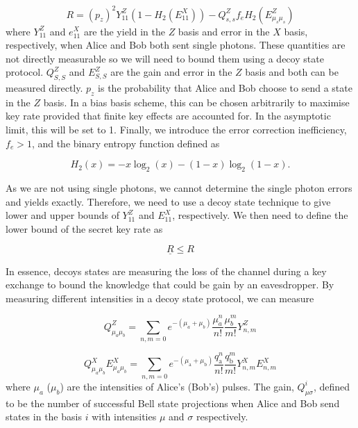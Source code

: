 \begin{equation}
	R = (p_z)^2 Y_{11}^Z \left(1 - H_2(E_{11}^X)\right) - Q_{s,s}^Z f_e H_2(E_{\mu_s\mu_s}^Z)
\end{equation}
where $Y_{11}^Z$ and $e_{11}^X$ are the yield in the $Z$ basis and error in the $X$ basis, respectively, when Alice and Bob both sent single photons. These quantities are not directly measurable so we will need to bound them using a decoy state protocol. $Q_{S,S}^Z$ and $E_{S,S}^Z$ are the gain and error in the $Z$ basis and both can be measured directly. $p_z$  is the probability that Alice and Bob choose to send a state in the $Z$ basis. In a bias basis scheme, this can be chosen arbitrarily to maximise key rate provided that finite key effects are accounted for. In the asymptotic limit, this will be set to 1. Finally, we introduce the error correction inefficiency, $f_e>1$, and the binary entropy function defined as

\begin{equation}
	H_2(x) = -x \log_2(x) - (1-x) \log_2(1-x).
\end{equation}

As we are not using single photons, we cannot determine the single photon errors and yields exactly. Therefore, we need to use a decoy state technique \cite{Lo2005} to give lower and upper bounds of $Y_{11}^Z$ and $E_{11}^X$, respectively. We then need to define the lower bound of the secret key rate as

\begin{equation}
	\underline{R} \leq R
\end{equation}

In essence, decoys states are measuring the loss of the channel during a key exchange to bound the knowledge that could be gain by an eavesdropper.  By measuring different intensities in a decoy state protocol, we can measure

\begin{equation}
	Q_{\mu_a \mu_b}^Z = \sum_{n,m=0} e^{-(\mu_a + \mu_b)}\frac{\mu_a^n}{n!}\frac{\mu_b^m}{m!} Y_{n,m}^Z
\end{equation}

\begin{equation}
	Q_{\mu_{a} \mu_{b}}^X E^{X}_{\mu_{a} \mu_{b}}=\sum_{n, m=0} e^{-\left(\mu_{\mathrm{a}}+\mu_{\mathrm{b}}\right)} \frac{q_{\mathrm{a}}^{n}}{n !} \frac{q_{\mathrm{b}}^{m}}{m !} Y^{X}_{n, m} E^{X}_{n, m}
\end{equation}
where $\mu_a$ ($\mu_b$) are the intensities of Alice's (Bob's) pulses. The gain, $Q_{\mu\sigma}^i$, defined to be the number of successful Bell state projections when Alice and Bob send states in the basis $i$ with intensities $\mu$ and $\sigma$ respectively.


